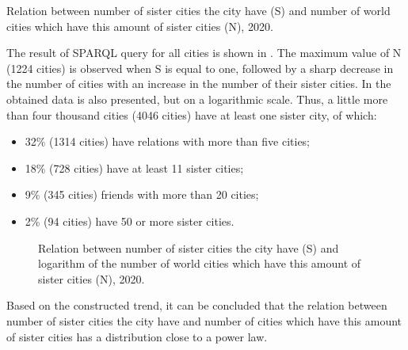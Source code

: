 \begin{marginfigure}
{
\setlength{\fboxsep}{0pt}%
\setlength{\fboxrule}{1pt}%
}
	\caption{Relation between number of sister cities the city have (S) and number of world cities which have this amount of sister cities (N), 2020.}
\end{marginfigure}

The result of SPARQL query for all cities is shown in . The maximum value of N (\num{1224} cities) is observed when S is equal to one, followed by a sharp decrease in the number of cities with an increase in the number of their sister cities. In  the obtained data is also presented, but on a logarithmic scale. Thus, a little more than four thousand cities (4046 cities) have at least one sister city, of which:

\begin{itemize}
\item 32\% (1314 cities) have relations with more than five cities;
\item 18\% (728 cities) have at least 11 sister cities;
\item 9\% (345 cities) friends with more than 20 cities;
\item 2\% (94 cities) have 50 or more sister cities.
\end{itemize}

\begin{figure*}[h]
{
\setlength{\fboxsep}{0pt}%
\setlength{\fboxrule}{1pt}%
%
}
  \caption{Relation between number of sister cities the city have (S) and logarithm of the number of world cities which have this amount of sister cities (N), 2020.}%
\end{figure*}

Based on the constructed trend, it can be concluded that the relation between number of sister cities the city have and number of cities which have this amount of sister cities has a distribution close to a power law.

